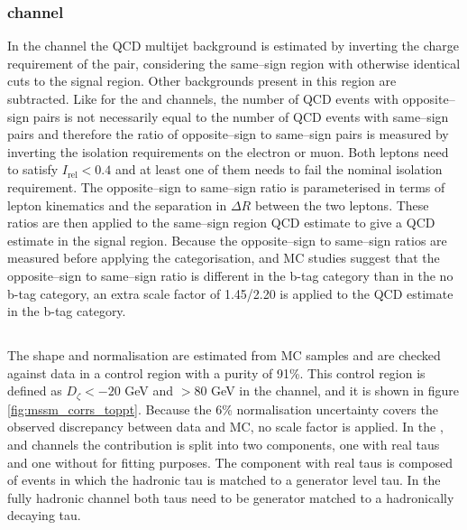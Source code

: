 \subsubsection{\texorpdfstring{\emu channel}{e mu channel}}
\label{sec:mssm_bkgs_qcd_em}
In the \emu channel the QCD multijet background
is estimated by inverting the charge requirement
of the pair, considering the same--sign region
with otherwise identical cuts to the signal region.
Other backgrounds present in this region are subtracted.
Like for the \etau and \mutau channels, the number of
QCD events with opposite--sign \emu pairs is not
necessarily equal to the number of QCD events
with same--sign \emu pairs and therefore the ratio
of opposite--sign to same--sign pairs is measured by inverting
the isolation requirements on the electron or muon. Both
leptons need to satisfy $I_{\text{rel}} < 0.4$ and at 
least one of them needs to fail the nominal isolation requirement.
The opposite--sign to same--sign ratio is parameterised in terms
of lepton kinematics and the separation in $\Delta R$ between the
two leptons. These ratios are then applied to the same--sign region
QCD estimate to give a QCD estimate in the signal region. 
Because the opposite--sign to same--sign ratios are measured
before applying the categorisation, and \ac{MC} studies suggest
that the opposite--sign to same--sign ratio is different in the b-tag
category than in the no b-tag category, an extra scale factor of 
1.45/2.20 is applied to the QCD estimate in the b-tag category.


\subsection{\texorpdfstring{\ttbar}{ttbar}}
\label{sec:mssm_bkgs_tt}
The \ttbar shape and normalisation are estimated from \ac{MC} 
samples and are checked against data in a control
region with a \ttbar purity of 91\%. This control region
is defined as $D_{\zeta} < -20$ GeV and \MET $>80$ GeV in 
the \emu channel, and it is shown in figure \ref{fig:mssm_corrs_toppt}.
Because the 6\%
\ttbar normalisation uncertainty covers the observed
discrepancy between data and \ac{MC}, no scale factor is applied.
In the \mutau, \etau and \tautau channels
the \ttbar contribution is split into
two components, one with real taus and 
one without for fitting purposes. The component with real taus is composed
of \ttbar events in which the hadronic tau is matched
to a generator level tau. In the fully hadronic channel
both taus need to be generator matched to a hadronically
decaying tau.

